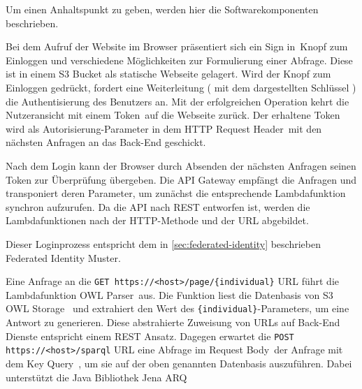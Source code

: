\documentclass[
12pt,
english,
ngerman,
headsepline,
twoside,
openright,
numbers=noenddot,version=first
]{scrreprt}
\begin{document}
Um einen Anhaltspunkt zu geben, werden hier die Softwarekomponenten beschrieben.

Bei dem Aufruf der Website im Browser präsentiert sich ein \glqq Sign in\grqq\ Knopf zum Einloggen und verschiedene Möglichkeiten zur Formulierung einer Abfrage. Diese ist in einem \acrshort{S3} Bucket als statische Webseite gelagert.
Wird der Knopf zum Einloggen gedrückt, fordert eine Weiterleitung ( mit dem dargestellten Schlüssel ) die Authentisierung des Benutzers an. Mit der erfolgreichen Operation kehrt die Nutzeransicht mit einem \glqq Token\grqq\ auf die Webseite zurück. Der erhaltene Token wird als Autorisierung-Parameter in dem \glqq HTTP Request Header\grqq\ mit den nächsten Anfragen an das Back-End geschickt.

Nach dem Login kann der Browser durch Absenden der nächsten Anfragen seinen Token zur Überprüfung übergeben. Die \acrshort{API} Gateway empfängt die Anfragen und transponiert deren Parameter, um zunächst die entsprechende Lambdafunktion synchron aufzurufen. Da die \acrshort{API} nach \acrshort{REST} entworfen ist, werden die Lambdafunktionen nach der \acrshort{HTTP}-Methode und der \acrshort{URL} abgebildet.

Dieser Loginprozess entspricht dem in \autoref{sec:federated-identity} beschrieben Federated Identity Muster.

Eine Anfrage an die \lstinline|GET https://<host>/page/{individual}| \acrshort{URL} führt die Lambdafunktion \glqq OWL Parser\grqq\ aus. Die Funktion liest die Datenbasis von S3 \glqq OWL Storage \grqq\ und extrahiert den Wert des \lstinline|{individual}|-Parameters, um eine Antwort zu generieren. Diese abstrahierte Zuweisung von \acrshort{URL}s auf Back-End Dienste entspricht einem \acrshort{REST} Ansatz. Dagegen erwartet die \lstinline|POST https://<host>/sparql| \acrshort{URL} eine Abfrage im \glqq Request Body\grqq\ der Anfrage mit dem Key \glqq Query\grqq\ , um sie auf der oben genannten Datenbasis auszuführen. Dabei unterstützt die Java Bibliothek Jena ARQ\cite{jenaARQ}
\end{document}
